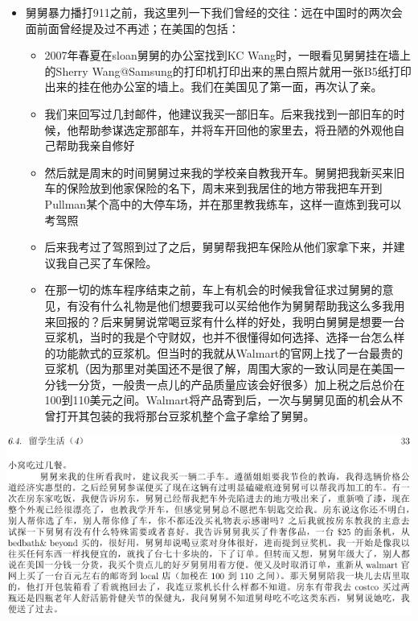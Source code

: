 \documentclass[9pt, b5paper]{article}
\begin{document}
\begin{enumerate}
\begin{itemize}
\item 舅舅暴力播打911之前，我这里列一下我们曾经的交往：远在中国时的两次会面前面曾经提及过不再述；在美国的包括：
\begin{itemize}
\item 2007年春夏在sloan舅舅的办公室找到KC Wang时，一眼看见舅舅挂在墙上的Sherry Wang@Samsung的打印机打印出来的黑白照片就用一张B5纸打印出来的挂在他办公室的墙上。我们在美国见了第一面，再次认了亲。
\item 我们来回写过几封邮件，他建议我买一部旧车。后来我找到一部旧车的时候，他帮助参谋选定那部车，并将车开回他的家里去，将丑陋的外观他自己帮助我亲自修好
\item 然后就是周末的时间舅舅过来我的学校亲自教我开车。舅舅把我新买来旧车的保险放到他家保险的名下，周末来到我居住的地方带我把车开到Pullman某个高中的大停车场，并在那里教我练车，这样一直炼到我可以考驾照
\item 后来我考过了驾照到过了之后，舅舅帮我把车保险从他们家拿下来，并建议我自己买了车保险。
\item 在那一切的炼车程序结束之前，车上有机会的时候我曾征求过舅舅的意见，有没有什么礼物是他们想要我可以买给他作为舅舅帮助我这么多我用来回报的？后来舅舅说常喝豆浆有什么样的好处，我明白舅舅是想要一台豆浆机，当时的我是个守财奴，也并不很懂得如何选择、选择一台怎么样的功能款式的豆浆机。但当时的我就从Walmart的官网上找了一台最贵的豆浆机（因为那里对美国还不是很了解，周围大家的一致认同是在美国一分钱一分货，一般贵一点儿的产品质量应该会好很多）加上税之后总价在100到110美元之间。Walmart将产品寄到后，一次与舅舅见面的机会从不曾打开其包装的我将那台豆浆机整个盒子拿给了舅舅。
\end{itemize}
\end{itemize}

\includegraphics[width=.9\linewidth]{./pic/p1p33.png}


\end{enumerate}
\end{document}
